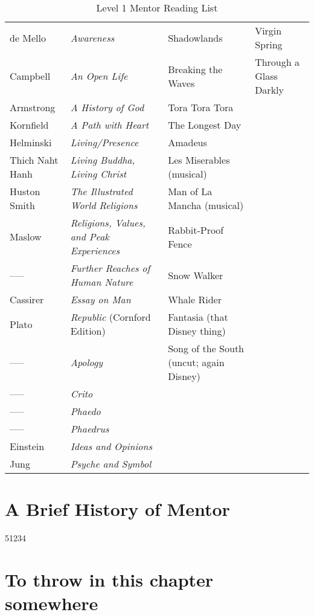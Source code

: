 \begin{sidewaystable*}[htb]
\begin{tabular}{|ll|l|l|}
		de Mello 				& \emph{Awareness} 												& Shadowlands										& Virgin Spring \\
		Campbell 				& \emph{An Open Life} 										& Breaking the Waves 						& Through a Glass Darkly \\
		Armstrong 			& \emph{A History of God} 								& Tora Tora Tora 								&  \\
		Kornfield 			& \emph{A Path with Heart} 								& The Longest Day 							&  \\
		Helminski 			& \emph{Living/Presence} 									& Amadeus 											&  \\
		Thich Naht Hanh  & \emph{Living Buddha, Living Christ} 		& Les Miserables (musical) 			&  \\
		Huston Smith 		& \emph{The Illustrated World Religions} 	& Man of La Mancha (musical) 		&  \\
		Maslow 					& \emph{Religions, Values, and Peak Experiences} & Rabbit-Proof Fence 		&  \\
		----- 					& \emph{Further Reaches of Human Nature} 	& Snow Walker 									&  \\
		Cassirer 				& \emph{Essay on Man} 										& Whale Rider 									&  \\
		Plato 					& \emph{Republic} (Cornford Edition) 			& Fantasia (that Disney thing) 	&  \\
		----- 					& \emph{Apology} 													& Song of the South (uncut; again Disney) &  \\
		----- 					& \emph{Crito} 														&  &  \\
		----- 					& \emph{Phaedo} 													&  &  \\
		----- 					& \emph{Phaedrus} 												&  &  \\
		Einstein 				& \emph{Ideas and Opinions} 							&  &  \\
		Jung 						& \emph{Psyche and Symbol} 								&  &  \\
		\hline
	\end{tabular}
	\caption{Level 1 Mentor Reading List}
	\label{tab:L1readinglist}
\end{sidewaystable*}

\section{A Brief History of Mentor}

51234

\section{To throw in this chapter somewhere}

